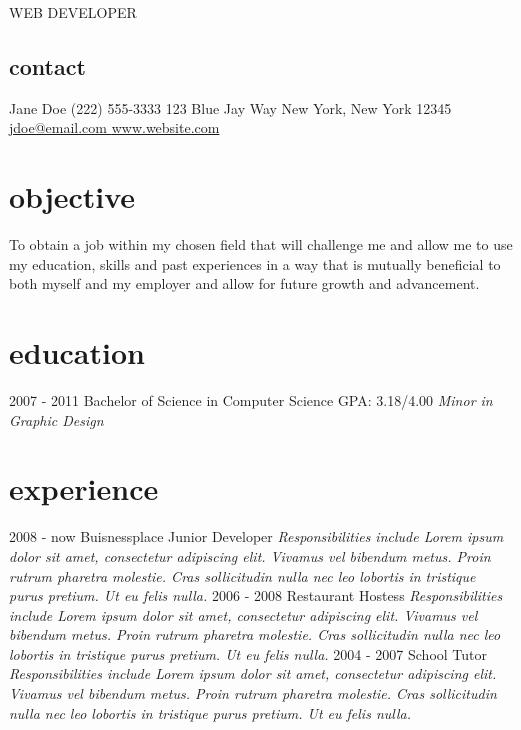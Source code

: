 \documentclass[]{friggeri-cv}
\begin{document}
       {WEB DEVELOPER }


\begin{aside}
  \section{contact}
    Jane Doe 
    (222) 555-3333 
    123 Blue Jay Way 
    New York, New York 12345 
    \href{mailto:jdoe@email.com }{jdoe@email.com }
    \href{http://www.website.com}{www.website.com}
\end{aside}

\section{objective}
To obtain a job within my chosen field that will challenge me and allow me to use my education, skills and past experiences in a way that is mutually beneficial to both myself and my employer and allow for future growth and advancement.

\section{education}

\begin{entrylist}
  \entry
    {2007 - 2011}
    {Bachelor of Science {\normalfont in Computer Science}}
    {GPA: 3.18/4.00}
    {\emph{Minor in Graphic Design}}

\end{entrylist}

\section{experience}

\begin{entrylist}
  \entry
    {2008 - now}
    {Buisnessplace}
    {Junior Developer}
    {\emph{Responsibilities include Lorem ipsum dolor sit amet, consectetur adipiscing elit. Vivamus vel bibendum metus. Proin rutrum pharetra molestie. Cras sollicitudin nulla nec leo lobortis in tristique purus pretium. Ut eu felis nulla.}}
  \entry
    {2006 - 2008}
    {Restaurant}
    {Hostess}
    {\emph{Responsibilities include Lorem ipsum dolor sit amet, consectetur adipiscing elit. Vivamus vel bibendum metus. Proin rutrum pharetra molestie. Cras sollicitudin nulla nec leo lobortis in tristique purus pretium. Ut eu felis nulla.}}
  \entry
    {2004 - 2007}
    {School}
    {Tutor}
    {\emph{Responsibilities include Lorem ipsum dolor sit amet, consectetur adipiscing elit. Vivamus vel bibendum metus. Proin rutrum pharetra molestie. Cras sollicitudin nulla nec leo lobortis in tristique purus pretium. Ut eu felis nulla.}}
\end{entrylist}
\end{document}
